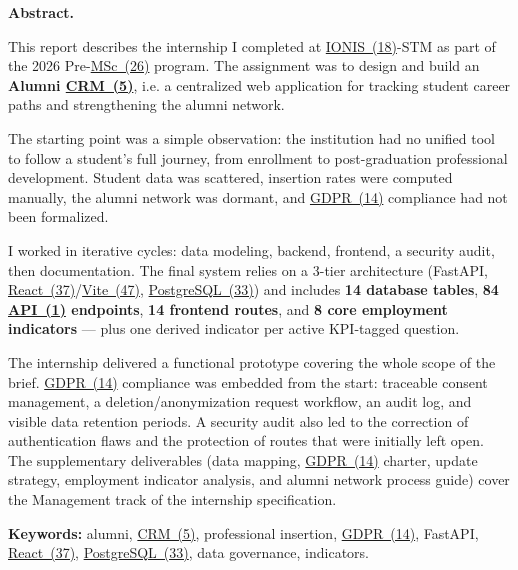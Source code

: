 \documentclass[12pt,a4paper]{report}
\begin{document}
\vspace{0.7cm}

\noindent\textbf{Abstract.}

\begin{tcolorbox}[
  colback=white, colframe=axongray, arc=4pt, boxrule=0.8pt,
  left=14pt, right=14pt, top=10pt, bottom=10pt
]
This report describes the internship I completed at \hyperlink{abbr-IONIS}{IONIS~(18)}-STM as part of the 2026 Pre-\hyperlink{abbr-MSc}{MSc~(26)} program. The assignment was to design and build an \textbf{Alumni \hyperlink{abbr-CRM}{CRM~(5)}}, i.e. a centralized web application for tracking student career paths and strengthening the alumni network.

\medskip
The starting point was a simple observation: the institution had no unified tool to follow a student's full journey, from enrollment to post-graduation professional development. Student data was scattered, insertion rates were computed manually, the alumni network was dormant, and \hyperlink{abbr-GDPR}{GDPR~(14)} compliance had not been formalized.

\medskip
I worked in iterative cycles: data modeling, backend, frontend, a security audit, then documentation. The final system relies on a 3-tier architecture (FastAPI, \hyperlink{abbr-React}{React~(37)}/\hyperlink{abbr-Vite}{Vite~(47)}, \hyperlink{abbr-PostgreSQL}{PostgreSQL~(33)}) and includes \textbf{14 database tables}, \textbf{84 \hyperlink{abbr-API}{API~(1)} endpoints}, \textbf{14 frontend routes}, and \textbf{8 core employment indicators} — plus one derived indicator per active KPI-tagged question.

\medskip
The internship delivered a functional prototype covering the whole scope of the brief. \hyperlink{abbr-GDPR}{GDPR~(14)} compliance was embedded from the start: traceable consent management, a deletion/anonymization request workflow, an audit log, and visible data retention periods. A security audit also led to the correction of authentication flaws and the protection of routes that were initially left open. The supplementary deliverables (data mapping, \hyperlink{abbr-GDPR}{GDPR~(14)} charter, update strategy, employment indicator analysis, and alumni network process guide) cover the Management track of the internship specification.
\end{tcolorbox}

\begin{tcolorbox}[
  colback=axonlight, colframe=axongray, arc=4pt, boxrule=0.8pt,
  left=12pt, right=12pt, top=8pt, bottom=8pt
]
\noindent\textbf{Keywords:} alumni, \hyperlink{abbr-CRM}{CRM~(5)}, professional insertion, \hyperlink{abbr-GDPR}{GDPR~(14)}, FastAPI, \hyperlink{abbr-React}{React~(37)}, \hyperlink{abbr-PostgreSQL}{PostgreSQL~(33)}, data governance, indicators.
\end{tcolorbox}
\end{document}
